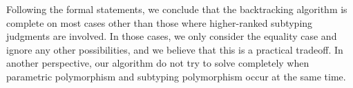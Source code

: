 Following the formal statements, we conclude that the backtracking algorithm
is complete on most cases other than those where higher-ranked
subtyping judgments are involved.
In those cases, we only consider the equality case and ignore any other possibilities,
and we believe that this is a practical tradeoff.
In another perspective, our algorithm do not try to solve completely when
parametric polymorphism and subtyping polymorphism occur at the same time.


